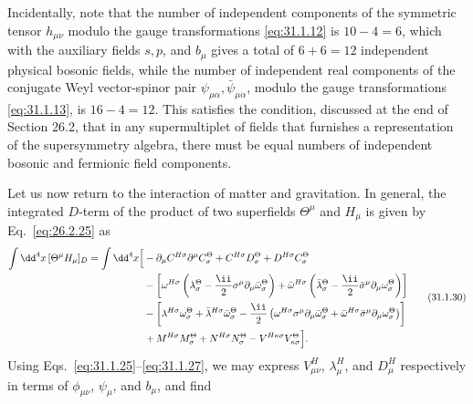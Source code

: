 Incidentally, note that the number of independent components of the symmetric
tensor \(h_{\mu\nu}\) modulo the gauge transformations \eqref{eq:31.1.12} is
\(10-4=6\), which with the auxiliary fields \(s,p\), and \(b_\mu\) gives a
total of \(6+6=12\) independent physical bosonic fields, while the number of
independent real components of the conjugate Weyl vector-spinor pair
\(\psi_{\mu\alpha},\bar\psi_{\mu\dot\alpha}\), modulo the gauge
transformations \eqref{eq:31.1.13}, is \(16-4=12\). This
satisfies the condition, discussed at the end of Section 26.2, that in any
supermultiplet of fields that furnishes a representation of the supersymmetry
algebra, there must be equal numbers of independent bosonic and fermionic
field components.

Let us now return to the interaction of matter and gravitation. In general,
the integrated \(D\)-term of the product of two superfields \(\Theta^\mu\)
and \(H_\mu\) is given by Eq.~\eqref{eq:26.2.25} as
\begin{equation}
  \begin{aligned}
  \int \dd^4x\,[\Theta^\mu H_\mu]_D
  =\int \dd^4x\Bigl[&
    -\partial_\mu C^{H\sigma}\partial^\mu C_\sigma^\Theta
    +C^{H\sigma}D_\sigma^\Theta
    +D^{H\sigma}C_\sigma^\Theta
  \\
  &-\left[
    \omega^{H\sigma}\left(
      \lambda_\sigma^\Theta
      -\frac{\ii}{2}\sigma^\mu\partial_\mu
       \bar\omega_\sigma^\Theta\right)
    +\bar\omega^{H\sigma}\left(
      \bar\lambda_\sigma^\Theta
      -\frac{\ii}{2}\bar\sigma^\mu\partial_\mu
       \omega_\sigma^\Theta\right)
  \right]
  \\
  &-\left[
    \lambda^{H\sigma}\omega_\sigma^\Theta
    +\bar\lambda^{H\sigma}\bar\omega_\sigma^\Theta
    -\frac{\ii}{2}\left(
      \omega^{H\sigma}\sigma^\mu\partial_\mu
        \bar\omega_\sigma^\Theta
      +\bar\omega^{H\sigma}\bar\sigma^\mu\partial_\mu
        \omega_\sigma^\Theta\right)
  \right]
  \\
  &+M^{H\sigma}M_\sigma^\Theta
    +N^{H\sigma}N_\sigma^\Theta
    -V^{H\kappa\sigma}V_{\kappa\sigma}^\Theta
  \Bigr].
  \end{aligned}
  \tag{31.1.30}\label{eq:31.1.30}
\end{equation}
Using Eqs.~\eqref{eq:31.1.25}--\eqref{eq:31.1.27}, we may express
\(V_{\mu\nu}^H\), \(\lambda_\mu^H\), and \(D_\mu^H\) respectively in terms
of \(\phi_{\mu\nu}\), \(\psi_\mu\), and \(b_\mu\), and find
